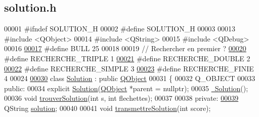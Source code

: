 \hypertarget{solution_8h_source}{}\subsection{solution.\+h}

\begin{DoxyCode}
00001 \textcolor{preprocessor}{#ifndef SOLUTION\_H}
00002 \textcolor{preprocessor}{#define SOLUTION\_H}
00003 
00013 \textcolor{preprocessor}{#include <QObject>}
00014 \textcolor{preprocessor}{#include <QString>}
00015 \textcolor{preprocessor}{#include <QDebug>}
00016 
\hyperlink{solution_8h_ac26e54839269cea6c170f2699af4ead2}{00017} \textcolor{preprocessor}{#define BULL                25}
00018 
00019 \textcolor{comment}{// Rechercher en premier ?}
\hyperlink{solution_8h_a911c709f6e0d892d5aa2c1da0d3f2d02}{00020} \textcolor{preprocessor}{#define RECHERCHE\_TRIPLE    1}
\hyperlink{solution_8h_af2093607a1488c24e74beed2dc996bf4}{00021} \textcolor{preprocessor}{#define RECHERCHE\_DOUBLE    2}
\hyperlink{solution_8h_a472930bff329899e6d9f3096fb778325}{00022} \textcolor{preprocessor}{#define RECHERCHE\_SIMPLE    3}
\hyperlink{solution_8h_a40ef173938ecf3bea081d59950fedce7}{00023} \textcolor{preprocessor}{#define RECHERCHE\_FINIE     4}
00024 
\hyperlink{class_solution}{00030} \textcolor{keyword}{class }\hyperlink{class_solution}{Solution} : \textcolor{keyword}{public} \hyperlink{class_q_object}{QObject}
00031 \{
00032     Q\_OBJECT
00033 \textcolor{keyword}{public}:
00034     \textcolor{keyword}{explicit} \hyperlink{class_solution_a378d4a570c95a6d4c013996fef75c6f0}{Solution}(\hyperlink{class_q_object}{QObject} *parent = \textcolor{keyword}{nullptr});
00035     \hyperlink{class_solution_a5d245f7409aacf6ace5e965b7879a580}{~Solution}();
00036     \textcolor{keywordtype}{void} \hyperlink{class_solution_a9ab0b0fd2b557f5abda8bd1a6da641e4}{trouverSolution}(\textcolor{keywordtype}{int} s, \textcolor{keywordtype}{int} flechettes);
00037 
00038 \textcolor{keyword}{private}:
\hyperlink{class_solution_a03b47dedfe8a8f8244f7e633cbaa30fb}{00039}     QString \hyperlink{class_solution_a03b47dedfe8a8f8244f7e633cbaa30fb}{solution};                       
00040 
00041     \textcolor{keywordtype}{void} \hyperlink{class_solution_a334ffddf70bd379a0af7c7e93750d6b5}{transmettreSolution}(\textcolor{keywordtype}{int} score);

\end{DoxyCode}
